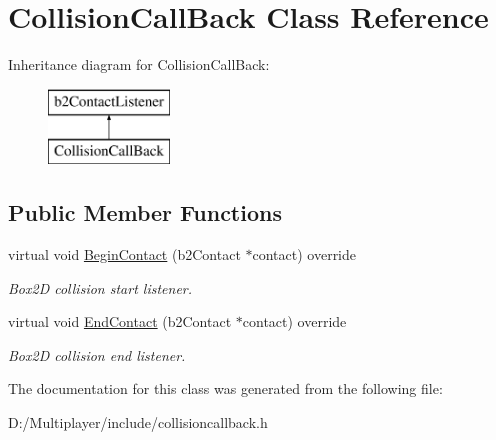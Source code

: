 \hypertarget{class_collision_call_back}{}\section{Collision\+Call\+Back Class Reference}
\label{class_collision_call_back}
Inheritance diagram for Collision\+Call\+Back\+:\begin{figure}[H]
\begin{center}
\leavevmode
\includegraphics[height=2.000000cm]{class_collision_call_back}
\end{center}
\end{figure}
\subsection*{Public Member Functions}
\begin{DoxyCompactItemize}
\item 
\mbox{\label{class_collision_call_back_a942cfb9f0d9eb682e56ee9f298d5b3b0}} 
virtual void \hyperlink{class_collision_call_back_a942cfb9f0d9eb682e56ee9f298d5b3b0}{Begin\+Contact} (b2\+Contact $\ast$contact) override
\begin{DoxyCompactList}\small\item\em Box2D collision start listener. \end{DoxyCompactList}\item 
\mbox{\label{class_collision_call_back_af8c0e7c724569fa711a03f1ba1906c0f}} 
virtual void \hyperlink{class_collision_call_back_af8c0e7c724569fa711a03f1ba1906c0f}{End\+Contact} (b2\+Contact $\ast$contact) override
\begin{DoxyCompactList}\small\item\em Box2D collision end listener. \end{DoxyCompactList}\end{DoxyCompactItemize}


The documentation for this class was generated from the following file\+:\begin{DoxyCompactItemize}
\item 
D\+:/\+Multiplayer/include/collisioncallback.\+h\end{DoxyCompactItemize}
